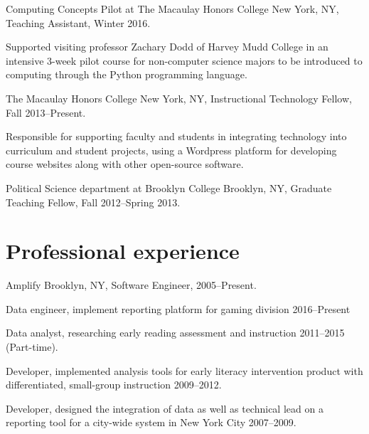 \documentclass[letterpaper]{article}
\renewenvironment{itemize}{
  \begin{list}{}{
    \setlength{\leftmargin}{1.5em}
  }
}{
  \end{list}
}
\begin{document}
\begin{itemize}
    \item Computing Concepts Pilot at The Macaulay Honors College New York, NY, Teaching Assistant, Winter 2016.
      \begin{itemize}
        \item Supported visiting professor Zachary Dodd of Harvey Mudd College in an intensive 3-week pilot course for non-computer science majors to be introduced to computing through the Python programming language.
      \end{itemize}
    \item The Macaulay Honors College New York, NY, Instructional Technology Fellow, Fall 2013--Present.
      \begin{itemize}
        \item Responsible for supporting faculty and students in integrating technology into curriculum and student projects, using a Wordpress platform for developing course websites along with other open-source software.
      \end{itemize}
    \item Political Science department at Brooklyn College Brooklyn, NY, Graduate Teaching Fellow, Fall 2012--Spring 2013.
\end{itemize}

\section*{Professional experience}

\begin{itemize}
    \item Amplify Brooklyn, NY, Software Engineer, 2005--Present.
        \begin{itemize}
            \item Data engineer, implement reporting platform for gaming division 2016--Present
            \item Data analyst, researching early reading assessment and instruction 2011--2015 (Part-time).
            \item Developer, implemented analysis tools for early literacy intervention product with differentiated, small-group instruction 2009--2012.
            \item Developer, designed the integration of data as well as technical lead on a reporting tool for a city-wide system in New York City 2007--2009.
        \end{itemize}
\end{itemize}
\end{document}
